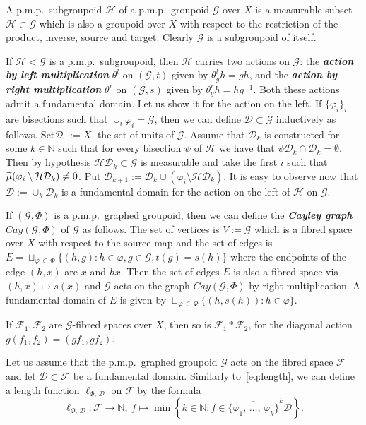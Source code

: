 \documentclass[AHL,Unicode,longabstracts,published]{cedram}
\newcommand{\defin}[1]{\textbf{\emph{#1}}}
\newcommand{\Nmath}{\mathbb{N}}
\newcommand{\ch}{\mathcal{H}}
\newcommand{\cg}{\mathcal{G}}
\newcommand{\cf}{\mathcal{F}}
\newcommand{\cd}{\mathcal{D}}
\newcommand{\ph}{\varphi}
\newcommand{\pmp}{p.m.p.\ }
\let\oldtilde\tilde
\renewcommand*{\tilde}[1]{\mathchoice{\widetilde{#1}}{\widetilde{#1}}{\oldtilde{#1}}{\oldtilde{#1}}}
\begin{document}
\begin{exam}\label{ex:subgroupoid}
A \pmp subgroupoid $\ch$ of a \pmp groupoid $\cg$ over $X$ is a measurable subset $\ch\subset \cg$ which is also a groupoid over $X$ with respect to the restriction of the product, inverse, source and target. Clearly $\cg$ is a subgroupoid of itself.

If $\ch<\cg$ is a \pmp subgroupoid, then $\ch$ carries two actions on $\cg$: the
\defin{action by left multiplication} $\theta^l$ on $(\cg, t)$ given by $\theta^l_g h=gh$, and the
\defin{action by right multiplication} $\theta^r$ on $(\cg, s)$ given by $\theta^r_g h=hg^{-1}$. Both these actions admit a fundamental domain. Let us show it for the action on the left. If $\{\ph_i\}_i$ are bisections such that $\cup_i\ph_i=\cg$, then we can define $\cd\subset \cg$ inductively as follows. Set\linebreak$\cd_0:=X$, the set of units of $\cg$. Assume that $\cd_k$ is constructed for some $k\in\Nmath$ such that for every bisection $\psi$ of $\ch$ we have that $\psi\cd_k\cap \cd_k=\emptyset$. Then by hypothesis $\ch\cd_k\subset \cg$ is measurable and take the first $i$ such that $\tilde \mu(\ph_i\setminus\ch\cd_k)\neq 0$. Put $\cd_{k+1}:=\cd_k\cup (\ph_i\setminus \ch\cd_k)$. It is easy to observe now that $\cd:=\cup_k \cd_k$ is a fundamental domain for the action on the left of $\ch$ on $\cg$.
\end{exam}

\begin{exam}\label{ex:Cayley}
If $(\cg,\Phi)$ is a \pmp graphed groupoid, then we can define the
\defin{Cayley graph} $Cay(\cg,\Phi)$ of $\cg$ as follows. The set of vertices is $V:=\cg$ which is a fibred space over $X$ with respect to the source map and the set of edges is $E=\sqcup_{\varphi\,\in\,\Phi} \{(h,g):h\in\varphi, g\in \cg, t(g)=s(h)\}$ where the endpoints of the edge $(h,x)$ are $x$ and $h x$. Then the set of edges $E$ is also a fibred space via $(h,x)\mapsto s(x)$ and $\cg$ acts on the graph $Cay(\cg,\Phi)$ by right multiplication. A fundamental domain of $E$ is given by $\sqcup_{\varphi\,\in\,\Phi} \{(h,s(h)):h\in\varphi\}$.
\end{exam}

\begin{exam}\label{example:fibredProductAction}
If $\cf_1,\cf_2$ are $\cg$-fibred spaces over $X$, then so is $\cf_1\ast\cf_2$, for the diagonal action $g(f_1,f_2)=(gf_1,gf_2)$.
\end{exam}

Let us assume that the \pmp graphed groupoid $\cg$ acts on the fibred space $\cf$ and let $\cd\subset\cf$ be a fundamental domain. Similarly to~\eqref{eq:length}, we can define a length function $\ell_{\Phi,\,\cd}$ on $\cf$ by the formula
\begin{equation}\label{eq:lengthact}
\ell_{\Phi,\,\cd}:\cf\rightarrow \Nmath,\ f\mapsto \min\left\{ k\in\Nmath: f\in \overline{\{\ph_1,\,\dots,\,\ph_k\}}^k\cd\right\}.
\end{equation}
\end{document}
